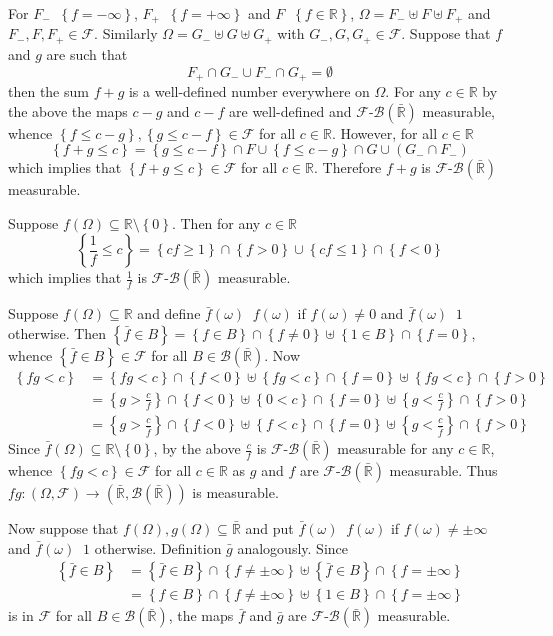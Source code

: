 \documentclass[a4paper]{article}
\newcommand{\obj}[1]{\left\{ #1 \right \}}
\newcommand{\brac}[1]{\left ( #1 \right )}
\newcommand{\Rbar}{{\bar{\mathbb{R}}}}
\newcommand{\Real}{\mathbb{R}}
\newcommand{\Fcal}{\mathcal{F}}
\newcommand{\borel}[1]{\mathcal{B}\brac{#1}}
\newcommand{\defn}{\mathop{\overset{\Delta}{=}}\nolimits}
\begin{document}
For $F_-\defn \obj{f=-\infty}$, $F_+\defn \obj{f=+\infty}$ and $F\defn \obj{f\in \Real}$, $\Omega=F_-\uplus F\uplus F_+$ and $F_-,F,F_+\in\Fcal$. Similarly $\Omega=G_-\uplus G\uplus G_+$ with $G_-,G,G_+\in\Fcal$. Suppose that $f$ and $g$ are such that \[F_+\cap G_-\cup F_-\cap G_+=\emptyset\] then the sum $f+g$ is a well-defined number everywhere on $\Omega$. For any $c\in\Real$ by the above the maps $c-g$ and $c-f$ are well-defined and $\Fcal$-$\borel{\Rbar}$ measurable, whence $\obj{f\leq c-g},\obj{g\leq c-f}\in\Fcal$ for all $c\in\Real$. However, for all $c\in\Real$ \[\obj{f+g\leq c} = \obj{g\leq c-f}\cap F \cup \obj{f\leq c-g}\cap G \cup \brac{G_- \cap F_-}\] which implies that $\obj{f+g\leq c}\in\Fcal$ for all $c\in\Real$. Therefore $f+g$ is $\Fcal$-$\borel{\Rbar}$ measurable.

Suppose $f\brac{\Omega}\subseteq \Real\setminus \obj{0}$. Then for any $c\in\Real$ \[\obj{\frac{1}{f}\leq c} = \obj{c f \geq 1}\cap \obj{f>0} \cup \obj{c f \leq 1}\cap \obj{f<0}\] which implies that $\frac{1}{f}$ is $\Fcal$-$\borel{\Rbar}$ measurable.

Suppose $f\brac{\Omega}\subseteq\Real$ and define $\bar{f}\brac{\omega}\defn f\brac{\omega}$ if $f\brac{\omega}\neq0$ and $\bar{f}\brac{\omega}\defn 1$ otherwise. Then $\obj{\bar{f}\in B}=\obj{f\in B}\cap\obj{f\neq0}\uplus\obj{1\in B}\cap\obj{f=0}$, whence $\obj{\bar{f}\in B}\in\Fcal$ for all $B\in\borel{\Rbar}$. Now \begin{align*}\obj{fg<c} &= \obj{fg<c} \cap \obj{f<0} \uplus \obj{fg<c} \cap \obj{f=0} \uplus \obj{fg<c} \cap \obj{f>0}\\ &= \obj{g>\frac{c}{f}} \cap \obj{f<0} \uplus \obj{0<c} \cap \obj{f=0} \uplus \obj{g<\frac{c}{f}} \cap \obj{f>0}\\ &= \obj{g>\frac{c}{\bar{f}}} \cap \obj{f<0} \uplus \obj{f<c} \cap \obj{f=0} \uplus \obj{g<\frac{c}{\bar{f}}} \cap \obj{f>0} \end{align*} Since $\bar{f}\brac{\Omega}\subseteq \Real\setminus\obj{0}$, by the above $\frac{c}{f}$ is $\Fcal$-$\borel{\Rbar}$ measurable for any $c\in \Real$, whence $\obj{fg < c}\in\Fcal$ for all $c\in\Real$ as $g$ and $f$ are $\Fcal$-$\borel{\Rbar}$ measurable. Thus $f g:\brac{\Omega, \Fcal}\to\brac{\Rbar,\borel{\Rbar}}$ is measurable.

Now suppose that $f\brac{\Omega},g\brac{\Omega}\subseteq \Rbar$ and put $\bar{f}\brac{\omega}\defn f\brac{\omega}$ if $f\brac{\omega}\neq \pm\infty$ and $\bar{f}\brac{\omega}\defn 1$ otherwise. Definition $\bar{g}$ analogously. Since \begin{align*}\obj{\bar{f}\in B}&=\obj{\bar{f}\in B}\cap \obj{f\neq\pm\infty} \uplus \obj{\bar{f}\in B}\cap \obj{f=\pm\infty}\\&=\obj{f\in B}\cap \obj{f\neq\pm\infty} \uplus \obj{1\in B}\cap \obj{f=\pm\infty}\end{align*} is in $\Fcal$ for all $B\in\borel{\Rbar}$, the maps $\bar{f}$ and $\bar{g}$ are $\Fcal$-$\borel{\Rbar}$ measurable.
\end{document}
